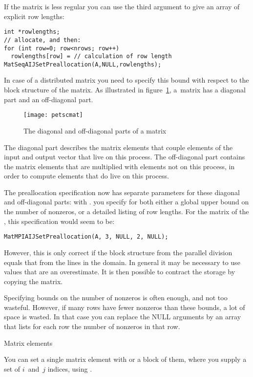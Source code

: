 If the matrix is less regular you can use the third argument to give
an array of explicit row lengths:
\begin{lstlisting}
int *rowlengths;
// allocate, and then:
for (int row=0; row<nrows; row++)
  rowlengths[row] = // calculation of row length
MatSeqAIJSetPreallocation(A,NULL,rowlengths);
\end{lstlisting}

In case of a distributed matrix you need to specify this bound with
respect to the block structure of the matrix. As illustrated in figure~\ref{fig:petscmat},
a~matrix has a diagonal part and an off-diagonal part.
%
\begin{figure}[ht]
  \texttt{[image: petscmat]}
  \caption{The diagonal and off-diagonal parts of a matrix}
  \label{fig:petscmat}
\end{figure}
%
The diagonal part describes the matrix elements that couple elements of the
input and output vector that live on this process. The off-diagonal part contains the
matrix elements that are multiplied with elements not on this process, in order to compute
elements that do live on this process.

The preallocation specification now has separate parameters for
these diagonal and off-diagonal parts:
with 
.
you specify for both either a global upper bound on the number of nonzeros,
or a detailed listing of row lengths.
For the matrix of the , this specification
would seem to be:
\begin{lstlisting}
MatMPIAIJSetPreallocation(A, 3, NULL, 2, NULL);
\end{lstlisting}
However, this is only correct if the block structure from the parallel division
equals that from the lines in the domain.
In general it may be necessary to use values that are an overestimate.
It is then possible to contract the storage by copying the matrix.

Specifying bounds on the number of nonzeros is often enough, and not too wasteful. However,
if many rows have fewer nonzeros than these bounds, a lot of space is
wasted. In that case you can replace the NULL arguments by an array
that lists for each row the number of nonzeros in that row.

 {Matrix elements}

You can set a single matrix element with
%
%
or a block of them, where you
supply a set of $i$~and~$j$ indices, using
%
. 

